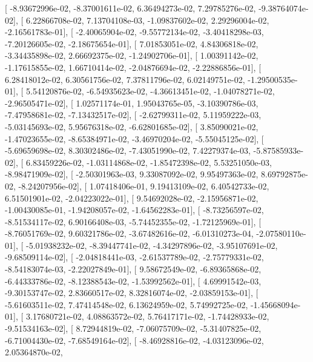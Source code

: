 \documentclass{article}
\begin{document}
       [ -8.93672996e-02,  -8.37001611e-02,   6.36494273e-02,
          7.29785276e-02,  -9.38764074e-02],
       [  6.22866708e-02,   7.13704108e-03,  -1.09837602e-02,
          2.29296004e-02,  -2.16561783e-01],
       [ -2.40065904e-02,  -9.55772134e-02,  -3.40418298e-03,
         -7.20126605e-02,  -2.18675654e-01],
       [  7.01853051e-02,   4.84306818e-02,  -3.34435898e-02,
          2.66692375e-02,  -1.24902706e-01],
       [  1.00391142e-02,  -1.17615855e-02,   1.66710414e-02,
         -2.04876694e-02,  -2.22886856e-01],
       [  6.28418012e-02,   6.30561756e-02,   7.37811796e-02,
          6.02149751e-02,  -1.29500535e-01],
       [  5.54120876e-02,  -6.54935623e-02,  -4.36613451e-02,
         -1.04078271e-02,  -2.96505471e-02],
       [  1.02571174e-01,   1.95043765e-05,  -3.10390786e-03,
         -7.47958681e-02,  -7.13432517e-02],
       [ -2.62799311e-02,   5.11959222e-03,  -5.03145693e-02,
          5.95676318e-02,  -6.62801685e-02],
       [  3.85090021e-02,  -1.47023655e-02,  -8.65384971e-02,
         -3.46970204e-02,  -5.55045125e-02],
       [ -5.69659698e-02,   8.30302486e-02,  -7.43051990e-02,
          7.42279374e-03,  -5.87585933e-02],
       [  6.83459226e-02,  -1.03114868e-02,  -1.85472398e-02,
          5.53251050e-03,  -8.98471909e-02],
       [ -2.50301963e-03,   9.33087092e-02,   9.95497363e-02,
          8.69792875e-02,  -8.24207956e-02],
       [  1.07418406e-01,   9.19413109e-02,   6.40542733e-02,
          6.51501901e-02,  -2.04223022e-01],
       [  9.54692028e-02,  -2.15956871e-02,  -1.00430085e-01,
         -1.94208057e-02,  -1.64562283e-01],
       [ -8.73256597e-02,  -8.51534117e-02,   6.90166408e-03,
         -5.74452355e-02,  -1.72125969e-01],
       [ -8.76051769e-02,   9.60321786e-02,  -3.67482616e-02,
         -6.01310273e-04,  -2.07580110e-01],
       [ -5.01938232e-02,  -8.39447741e-02,  -4.34297896e-02,
         -3.95107691e-02,  -9.68509114e-02],
       [ -2.04818441e-03,  -2.61537789e-02,  -2.75779331e-02,
         -8.54183074e-03,  -2.22027849e-01],
       [  9.58672549e-02,  -6.89365868e-02,  -6.44333786e-02,
         -8.12388543e-02,  -1.53992562e-01],
       [  4.69991542e-03,  -9.30153747e-02,   2.83660517e-02,
          8.32816074e-02,  -2.03859153e-01],
       [ -5.61603511e-02,   7.47414548e-02,   6.13624959e-02,
          5.74992725e-02,  -1.45668094e-01],
       [  3.17680721e-02,   4.08863572e-02,   5.76417171e-02,
         -1.74428933e-02,  -9.51534163e-02],
       [  8.72944819e-02,  -7.06075709e-02,  -5.31407825e-02,
         -6.71004430e-02,  -7.68549164e-02],
       [ -8.46928816e-02,  -4.03123096e-02,   2.05364870e-02,
\end{document}
